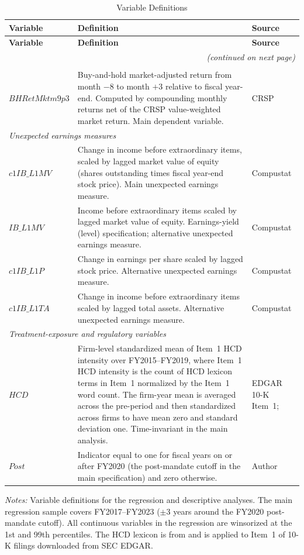 \documentclass[12pt]{article}
\begin{document}
{
\footnotesize
\setlength{\LTpre}{4pt}
\setlength{\LTpost}{4pt}
\begin{longtable}{p{3.2cm}p{8.5cm}p{2.6cm}}
\caption{Variable Definitions}\label{tab:vardef}\\
\toprule
\textbf{Variable} & \textbf{Definition} & \textbf{Source} \\
\midrule
\endfirsthead
\toprule
\textbf{Variable} & \textbf{Definition} & \textbf{Source} \\
\midrule
\endhead
\midrule
\multicolumn{3}{r}{\textit{(continued on next page)}} \\
\endfoot
\bottomrule
\endlastfoot

\multicolumn{3}{l}{\textit{Dependent variable}} \\
$BHRetMktm9p3$ & Buy-and-hold market-adjusted return from month $-8$ to month $+3$ relative to fiscal year-end. Computed by compounding monthly returns net of the CRSP value-weighted market return. Main dependent variable. & CRSP \\
\midrule
\multicolumn{3}{l}{\textit{Unexpected earnings measures}} \\
$c1IB\_L1MV$ & Change in income before extraordinary items, scaled by lagged market value of equity (shares outstanding times fiscal year-end stock price). Main unexpected earnings measure. & Compustat \\
$IB\_L1MV$ & Income before extraordinary items scaled by lagged market value of equity. Earnings-yield (level) specification; alternative unexpected earnings measure. & Compustat \\
$c1IB\_L1P$ & Change in earnings per share scaled by lagged stock price. Alternative unexpected earnings measure. & Compustat \\
$c1IB\_L1TA$ & Change in income before extraordinary items scaled by lagged total assets. Alternative unexpected earnings measure. & Compustat \\
\midrule
\multicolumn{3}{l}{\textit{Treatment-exposure and regulatory variables}} \\
$HCD$ & Firm-level standardized mean of Item~1 HCD intensity over FY2015--FY2019, where Item~1 HCD intensity is the count of HCD lexicon terms in Item~1 normalized by the Item~1 word count. The firm-year mean is averaged across the pre-period and then standardized across firms to have mean zero and standard deviation one. Time-invariant in the main analysis. & EDGAR 10-K Item~1; \citet{demers_al2024} \\
$Post$ & Indicator equal to one for fiscal years on or after FY2020 (the post-mandate cutoff in the main specification) and zero otherwise. & Author \\
\end{longtable}

\vspace{0.3em}
\noindent\textit{Notes:} Variable definitions for the regression and descriptive analyses. The main regression sample covers FY2017--FY2023 ($\pm 3$ years around the FY2020 post-mandate cutoff). All continuous variables in the regression are winsorized at the 1st and 99th percentiles. The HCD lexicon is from \citet{demers_al2024} and is applied to Item~1 of 10-K filings downloaded from SEC EDGAR.
}
\end{document}
